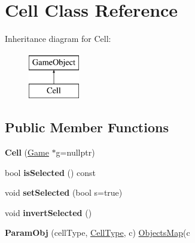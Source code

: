 \hypertarget{class_cell}{\section{\-Cell \-Class \-Reference}
\label{class_cell}
}
\-Inheritance diagram for \-Cell\-:\begin{figure}[H]
\begin{center}
\leavevmode
\includegraphics[height=2.000000cm]{class_cell}
\end{center}
\end{figure}
\subsection*{\-Public \-Member \-Functions}
\begin{DoxyCompactItemize}
\item 
\hypertarget{class_cell_aa838bde28d59df35b2fd6db54013ed40}{{\bfseries \-Cell} (\hyperlink{class_game}{\-Game} $\ast$g=nullptr)}\label{class_cell_aa838bde28d59df35b2fd6db54013ed40}

\item 
\hypertarget{class_cell_a394830e18401f3b414c3dde4a2b4e2e8}{bool {\bfseries is\-Selected} () const }\label{class_cell_a394830e18401f3b414c3dde4a2b4e2e8}

\item 
\hypertarget{class_cell_a40146bbb2b74cf56337462abc4d0327c}{void {\bfseries set\-Selected} (bool s=true)}\label{class_cell_a40146bbb2b74cf56337462abc4d0327c}

\item 
\hypertarget{class_cell_ad8310bd5ddbdcb3ab3036356556b32b3}{void {\bfseries invert\-Selected} ()}\label{class_cell_ad8310bd5ddbdcb3ab3036356556b32b3}

\item 
\hypertarget{class_cell_a6ea8829d05c8cf869e60d321e7649c6e}{{\bfseries \-Param\-Obj} (cell\-Type, \hyperlink{class_cell_type}{\-Cell\-Type}, c) \hyperlink{object_8h_a36f4eef4198c2aec7010e22c6223d13d}{\-Objects\-Map}(c}\label{class_cell_a6ea8829d05c8cf869e60d321e7649c6e}

\end{DoxyCompactItemize}
